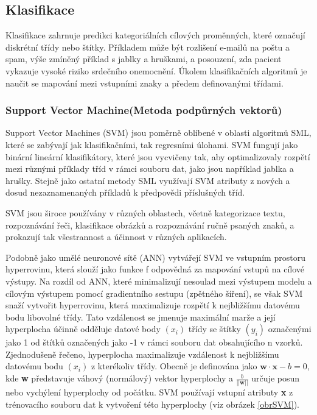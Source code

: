 \subsection{Klasifikace}
Klasifikace zahrnuje predikci kategoriálních cílových proměnných, které označují diskrétní třídy nebo štítky. Příkladem může být rozlišení e-mailů na poštu a spam, výše zmíněný příklad s jablky a hruškami, a posouzení, zda pacient vykazuje vysoké riziko srdečního onemocnění. Úkolem klasifikačních algoritmů je naučit se mapování mezi vstupními znaky a předem definovanými třídami.

\subsubsection{Support Vector Machine(Metoda podpůrných vektorů)}
Support Vector Machines (SVM)\cite{Steinwart2008} jsou poměrně oblíbené v oblasti algoritmů SML, které se zabývají jak klasifikačními, tak regresními úlohami. SVM fungují jako binární lineární klasifikátory, které jsou vycvičeny tak, aby optimalizovaly rozpětí mezi různými příklady tříd v rámci souboru dat, jako jsou například jablka a hrušky. Stejně jako ostatní metody SML využívají SVM atributy z nových a dosud nezaznamenaných příkladů k předpovědi příslušných tříd.

\newpage

SVM jsou široce používány v různých oblastech, včetně kategorizace textu, rozpoznávání řeči, klasifikace obrázků a rozpoznávání ručně psaných znaků, a prokazují tak všestrannost a účinnost v různých aplikacích.

Podobně jako umělé neuronové sítě (ANN) vytvářejí SVM ve vstupním prostoru hyperrovinu, která slouží jako funkce f odpovědná za mapování vstupů na cílové výstupy. Na rozdíl od ANN, které minimalizují nesoulad mezi výstupem modelu a cílovým výstupem pomocí gradientního sestupu (zpětného šíření), se však SVM snaží vytvořit hyperrovinu, která maximalizuje rozpětí k nejbližšímu datovému bodu libovolné třídy. Tato vzdálenost se jmenuje maximální marže a její hyperplocha účinně odděluje datové body \((x_i)\) třídy se štítky \((y_i)\) označenými jako 1 od štítků označených jako -1 v rámci souboru dat obsahujícího n vzorků. Zjednodušeně řečeno, hyperplocha maximalizuje vzdálenost k nejbližšímu datovému bodu \((x_i)\) z kterékoliv třídy. Obecně je definována jako \(\textbf{w}\cdot{\textbf{x}} - b = 0\), kde \textbf{w} představuje váhový (normálový) vektor hyperplochy a \(\frac{b}{||\textbf{w}||}\) určuje posun nebo vychýlení hyperplochy od počátku. SVM používají vstupní atributy \textbf{x} z trénovacího souboru dat k vytvoření této hyperplochy (viz obrázek \ref{obrSVM}).

